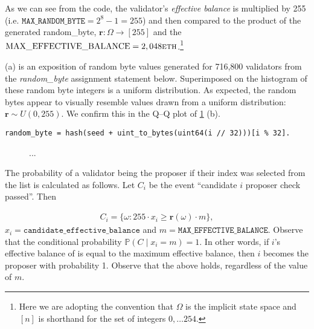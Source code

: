 \documentclass{article}
\newcommand{\rb}{\mathbf r}
\newcommand{\eb}{x}
\newcommand{\prob}{\mathbb P}
\newcommand{\maxeb}{m}
\begin{document}
As we can see from the code, the validator’s \emph{effective balance} is
multiplied by 255 (i.e.  $\texttt{MAX\_RANDOM\_BYTE} = 2^8 - 1 = 255$) and then
compared to the product of the generated random\_byte, $\rb: \Omega \rightarrow
[255]$ and the $\text{MAX\_EFFECTIVE\_BALANCE} = 2,048
\textsc{eth}$.\footnote{Here we are adopting the convention that $\Omega$ is
  the implicit state space and $[n]$ is shorthand for the set of integers $0,
\dots 254$.}
  

 (a) is an exposition of random byte values generated for 716,800
validators from the \emph{random\_byte} assignment statement below.
Superimposed on the histogram of these random byte integers is a uniform
distribution. As expected, the random bytes appear to visually resemble values
drawn from a uniform distribution: $\rb \sim U(0,255)$. We confirm this in 
the Q–Q plot of \cref{fig-rb} (b).

\begin{lstlisting}
random_byte = hash(seed + uint_to_bytes(uint64(i // 32)))[i % 32].
\end{lstlisting}

\begin{figure}
  ...
  \caption{\label{fig-rb}}
\end{figure}

The probability of a validator being the proposer if their index was selected
from the list is calculated as follows. Let $C_i$ be the event ``candidate $i$
proposer check passed''. Then

\begin{align} \label{eq-candidate}
  C_i = \{\omega : 255 \cdot \eb_i \geq \rb(\omega) \cdot \maxeb \},
\end{align}
$\eb_i = \texttt{candidate\_effective\_balance}$ and $\maxeb =
\texttt{MAX\_EFFECTIVE\_BALANCE}$.
Observe that the conditional probability $\prob(C \mid \eb_i = \maxeb) = 1$. In
other words, if $i$'s effective balance of is equal to the maximum effective
balance, then $i$ becomes the proposer with probability 1. Observe that the
above holds, regardless of the value of $\maxeb$.
\end{document}
